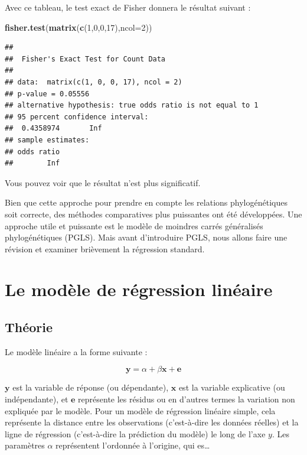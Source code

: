 \documentclass[
]{book}
\newenvironment{Shaded}{\begin{snugshade}}{\end{snugshade}}
\newcommand{\AttributeTok}[1]{\textcolor[rgb]{0.13,0.29,0.53}{#1}}
\newcommand{\DecValTok}[1]{\textcolor[rgb]{0.00,0.00,0.81}{#1}}
\newcommand{\FunctionTok}[1]{\textcolor[rgb]{0.13,0.29,0.53}{\textbf{#1}}}
\newcommand{\NormalTok}[1]{#1}
\begin{document}
Avec ce tableau, le test exact de Fisher donnera le résultat suivant :

\begin{Shaded}
\begin{Highlighting}[]
\FunctionTok{fisher.test}\NormalTok{(}\FunctionTok{matrix}\NormalTok{(}\FunctionTok{c}\NormalTok{(}\DecValTok{1}\NormalTok{,}\DecValTok{0}\NormalTok{,}\DecValTok{0}\NormalTok{,}\DecValTok{17}\NormalTok{),}\AttributeTok{ncol=}\DecValTok{2}\NormalTok{))}
\end{Highlighting}
\end{Shaded}

\begin{verbatim}
## 
##  Fisher's Exact Test for Count Data
## 
## data:  matrix(c(1, 0, 0, 17), ncol = 2)
## p-value = 0.05556
## alternative hypothesis: true odds ratio is not equal to 1
## 95 percent confidence interval:
##  0.4358974       Inf
## sample estimates:
## odds ratio 
##        Inf
\end{verbatim}

Vous pouvez voir que le résultat n'est plus significatif.

Bien que cette approche pour prendre en compte les relations phylogénétiques soit correcte, des méthodes comparatives plus puissantes ont été développées. Une approche utile et puissante est le modèle de moindres carrés généralisés phylogénétiques (PGLS). Mais avant d'introduire PGLS, nous allons faire une révision et examiner brièvement la régression standard.

\chapter{Le modèle de régression linéaire}\label{linear-regression}

\section{Théorie}\label{thuxe9orie}

Le modèle linéaire a la forme suivante :

\[\textbf{y} = \alpha + \beta \textbf{x} + \textbf{e}\]

\(\textbf{y}\) est la variable de réponse (ou dépendante), \(\textbf{x}\) est la variable explicative (ou indépendante), et \(\textbf{e}\) représente les résidus ou en d'autres termes la variation non expliquée par le modèle. Pour un modèle de régression linéaire simple, cela représente la distance entre les observations (c'est-à-dire les données réelles) et la ligne de régression (c'est-à-dire la prédiction du modèle) le long de l'axe \(y\). Les paramètres \(\alpha\) représentent l'ordonnée à l'origine, qui es\ldots{}
\end{document}
